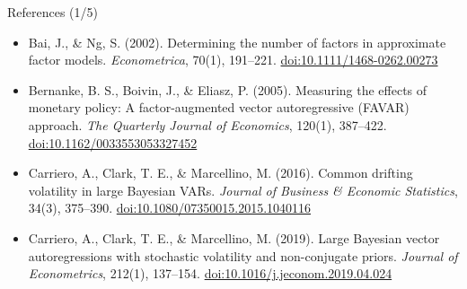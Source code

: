 \begin{frame}{References (1/5)}
\begin{itemize}
    \item Bai, J., \& Ng, S. (2002). Determining the number of factors in approximate factor models. \textit{Econometrica}, 70(1), 191--221. \href{https://doi.org/10.1111/1468-0262.00273}{doi:10.1111/1468-0262.00273}
    \item Bernanke, B. S., Boivin, J., \& Eliasz, P. (2005). Measuring the effects of monetary policy: A factor-augmented vector autoregressive (FAVAR) approach. \textit{The Quarterly Journal of Economics}, 120(1), 387--422. \href{https://doi.org/10.1162/0033553053327452}{doi:10.1162/0033553053327452}
    \item Carriero, A., Clark, T. E., \& Marcellino, M. (2016). Common drifting volatility in large Bayesian VARs. \textit{Journal of Business \& Economic Statistics}, 34(3), 375--390. \href{https://doi.org/10.1080/07350015.2015.1040116}{doi:10.1080/07350015.2015.1040116}
    \item Carriero, A., Clark, T. E., \& Marcellino, M. (2019). Large Bayesian vector autoregressions with stochastic volatility and non-conjugate priors. \textit{Journal of Econometrics}, 212(1), 137--154. \href{https://doi.org/10.1016/j.jeconom.2019.04.024}{doi:10.1016/j.jeconom.2019.04.024}
\end{itemize}
\end{frame}

